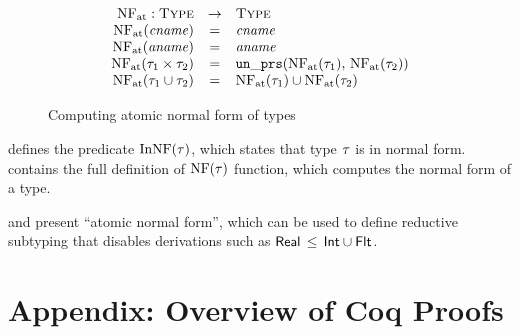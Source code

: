 \begin{figure}
	\[
	\begin{array}{rcl}
	\mathop{\mathrm{NF}_{\mathrm{at}}}: \textsc{Type} &\rightarrow& \textsc{Type} \\
	\mathop{\mathrm{NF}_{\mathrm{at}}}(\mathit{cname}) &=& \mathit{cname} \\
	\mathop{\mathrm{NF}_{\mathrm{at}}}(\mathit{aname}) &=& \mathit{aname} \\
	\mathop{\mathrm{NF}_{\mathrm{at}}}(\tau_1 \times \tau_2) &=& \mathop{\mathtt{un\_prs}}(\mathop{\mathrm{NF}_{\mathrm{at}}}(\tau_1), \, \mathop{\mathrm{NF}_{\mathrm{at}}}(\tau_2))	\\
	\mathop{\mathrm{NF}_{\mathrm{at}}}(\tau_1 \cup \tau_2) &=& \mathop{\mathrm{NF}_{\mathrm{at}}}(\tau_1) \cup \mathop{\mathrm{NF}_{\mathrm{at}}}(\tau_2) \\
	\end{array}
	\]
	\caption{Computing atomic normal form of \BetaJulia types}
	\label{fig:bjnom-calc-nf-full}
\end{figure}

 defines the predicate $\mathop{\mathrm{InNF}}(\tau)$, which states
that type $\tau$ is in normal form.
 contains the full definition of $\mathop{\mathrm{NF}}(\tau)$ 
function, which computes the normal form of a type.

 and  present 
``atomic normal form'', which can be used to define reductive subtyping
that disables derivations such as $\mathsf{Real} \, \leq \, \mathsf{Int} \cup \mathsf{Flt}$.

\section{Appendix: Overview of Coq Proofs}\label{app:proofs}

